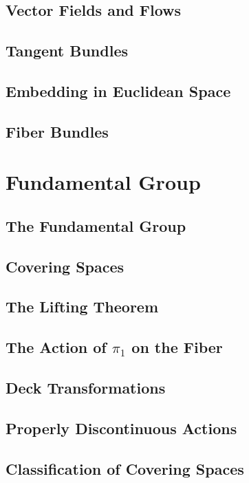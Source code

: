 \documentclass[oneside]{amsbook}
\numberwithin{prob}{section}
\begin{document}
\section{Vector Fields and Flows}

\section{Tangent Bundles}

\section{Embedding in Euclidean Space}

\setcounter{section}{12}
\section{Fiber Bundles}


\chapter{Fundamental Group}
\setcounter{section}{1}
\section{The Fundamental Group}

\section{Covering Spaces}

\section{The Lifting Theorem}

\section{The Action of $\pi_1$ on the Fiber}

\section{Deck Transformations}

\section{Properly Discontinuous Actions}

\section{Classification of Covering Spaces}

\end{document}
